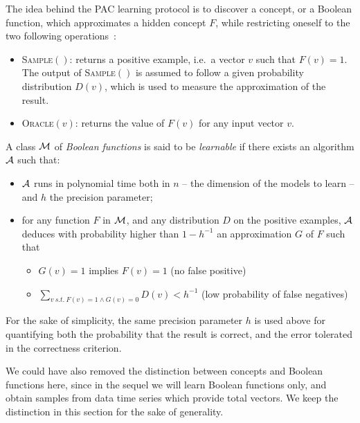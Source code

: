 \documentclass{llncs}
\begin{document}
The idea behind the PAC learning protocol is to discover a concept, or a Boolean function, which approximates a hidden concept $F$, while restricting oneself to the two following operations~:
\begin{itemize}
  \item
\textsc{Sample}$()$: returns a positive example, i.e.~a vector $v$ such that $F(v)=1$.
The output of \textsc{Sample}$()$ is assumed to follow a given probability distribution $D(v)$, which is used to measure the approximation of the result.
  \item
\textsc{Oracle}$(v)$: returns the value of $F(v)$ for any input vector $v$.
\end{itemize}


\begin{definition}
	\label{def:learnclass}
   A class $\cal M$ of \emph{Boolean functions} is said to be \emph{learnable}
   if there exists an algorithm $\cal A$ such that:
   \begin{itemize}
      \item $\cal A$ runs in polynomial time both in $n$ -- the dimension of the models to learn -- and $h$ the precision parameter;
      \item
         for any function $F$ in $\cal M$, and any distribution $D$ on the positive examples,
         $\cal A$ deduces with probability higher than $1-h^{-1}$ an approximation $G$ of $F$ such that
         \begin{itemize}
            \item $G(v)=1$ implies $F(v)=1$ (no false positive)
            \item
               $\displaystyle\sum_{v\ s.t.\ F(v)=1\wedge G(v)=0} D(v) < h^{-1}$ (low probability of false negatives)
         \end{itemize}
   \end{itemize}
\end{definition}

For the sake of simplicity, the same precision parameter $h$ is used above for quantifying both the probability that the result is correct,
and the error tolerated in the correctness criterion.

We could have also removed the distinction between concepts and Boolean functions here,
since in the sequel we will learn Boolean functions only, and obtain samples from data time series which provide total vectors.
We keep the distinction in this section for the sake of generality.
\end{document}
